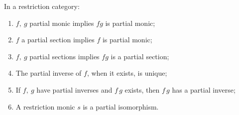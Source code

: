 \begin{lemma}
  \label{lem:rcs_partial_monic_section_inverse_properties}
  In a restriction category:
  \begin{enumerate}[{(}i{)}]
    \item $f,\ g$ partial monic implies $f g$ is partial monic;
    \item $f$ a partial section implies $f$ is partial monic;
    \item $f,\ g$ partial sections implies $f g$ is a partial section;
    \item The partial inverse of $f$, when it exists, is unique;
    \item If $f,\ g$ have partial inverses and $f\,g$ exists, then $f\,g$ has a partial inverse;
    \item A restriction monic $s$ is a partial isomorphism.
  \end{enumerate}
\end{lemma}
